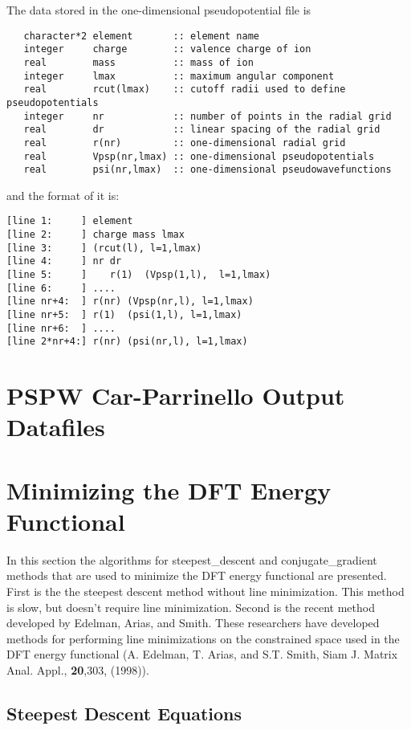 The data stored in the one-dimensional pseudopotential file is
\begin{verbatim}
   character*2 element       :: element name
   integer     charge        :: valence charge of ion
   real        mass          :: mass of ion
   integer     lmax          :: maximum angular component
   real        rcut(lmax)    :: cutoff radii used to define pseudopotentials
   integer     nr            :: number of points in the radial grid
   real        dr            :: linear spacing of the radial grid
   real        r(nr)         :: one-dimensional radial grid
   real        Vpsp(nr,lmax) :: one-dimensional pseudopotentials
   real        psi(nr,lmax)  :: one-dimensional pseudowavefunctions
\end{verbatim}
and the format of it is:
\begin{verbatim}
[line 1:     ] element	
[line 2:     ] charge mass lmax
[line 3:     ] (rcut(l), l=1,lmax)
[line 4:     ] nr dr
[line 5:     ]    r(1)  (Vpsp(1,l),  l=1,lmax)
[line 6:     ] ....
[line nr+4:  ] r(nr) (Vpsp(nr,l), l=1,lmax)
[line nr+5:  ] r(1)  (psi(1,l), l=1,lmax) 
[line nr+6:  ] ....
[line 2*nr+4:] r(nr) (psi(nr,l), l=1,lmax)
\end{verbatim}



\section{PSPW Car-Parrinello Output Datafiles}
\label{sec:pspw_cp_data}



\section{Minimizing the DFT Energy Functional}
\label{sec:pspw_Minimize}

In this section the algorithms for steepest\_descent and conjugate\_gradient 
methods that are used to minimize the DFT energy functional are presented.
First is the the steepest descent method without line minimization.   
This method is slow, but doesn't require line minimization.  
Second is the recent method developed by Edelman, Arias, and Smith.
These researchers have developed methods for performing line minimizations
on the constrained space used in the DFT energy functional
(A. Edelman, T. Arias, and S.T. Smith, Siam J. Matrix Anal. Appl., 
\textbf{20},303, (1998)).


\subsection{Steepest Descent Equations}
\label{sec:pspw_sd2}

